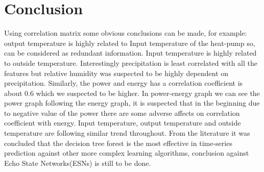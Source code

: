 \documentclass{scrartcl}
\begin{document}
\section{Conclusion} 
Using correlation matrix some obvious conclusions can be made, for example: output temperature is highly related to Input temperature of the heat-pump so, can be considered as redundant information. Input temperature is highly related to outside temperature. Interestingly precipitation is least correlated with all the features but relative humidity was suspected to be highly dependent on precipitation. Similarly, the power and energy has a correlation coefficient is about 0.6 which we suspected to be higher. In power-energy graph we can see the power graph following the energy graph, it is suspected that in the beginning due to negative value of the power there are some adverse affects on correlation coefficient with energy. Input temperature, output temperature and outside temperature are following similar trend throughout. From the literature it was concluded that the decision tree forest is the most effective in time-series prediction against other more complex learning algorithms, conclusion against Echo State Networks(ESNs) is still to be done.











%


\end{document}
